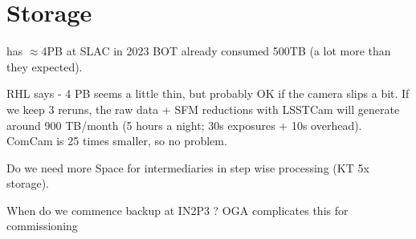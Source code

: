\section{Storage}

 has $\approx$4PB at SLAC in 2023
BOT already consumed 500TB (a lot more than they expected).

RHL says - 4 PB seems a little thin, but probably OK if the camera slips a bit.  If we keep 3 reruns, the raw data + SFM reductions with LSSTCam will generate around 900 TB/month (5 hours a night; 30s exposures + 10s overhead).  ComCam is 25 times smaller, so no problem.

Do we need more Space for intermediaries in step wise processing  (KT 5x storage).

When do we commence backup at IN2P3 ?  OGA complicates this for commissioning

